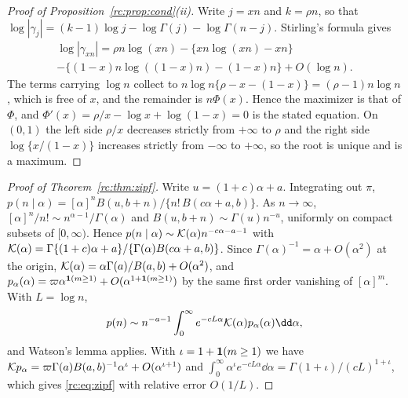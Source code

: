 \begin{proof}[Proof of Proposition~\ref{rc:prop:cond}(ii)]
Write $j=xn$ and $k=\rho n$, so that $\log|\gamma_j|=(k-1)\log j-\log\Gamma(j)-\log\Gamma(n-j)$. Stirling's formula gives
\begin{multline*}
\log|\gamma_{xn}|=\rho n\log(xn)-\{xn\log(xn)-xn\}\\
-\{(1-x)n\log((1-x)n)-(1-x)n\}+O(\log n).
\end{multline*}
The terms carrying $\log n$ collect to $n\log n\{\rho-x-(1-x)\}=(\rho-1)n\log n$, which is free of $x$, and the remainder is $n\Phi(x)$. Hence the maximizer is that of $\Phi$, and $\Phi'(x)=\rho/x-\log x+\log(1-x)=0$ is the stated equation. On $(0,1)$ the left side $\rho/x$ decreases strictly from $+\infty$ to $\rho$ and the right side $\log\{x/(1-x)\}$ increases strictly from $-\infty$ to $+\infty$, so the root is unique and is a maximum.
\end{proof}

\begin{proof}[Proof of Theorem~\ref{rc:thm:zipf}]
Write $u=(1+c)\alpha+a$. Integrating out $\pi$, $p(n\mid\alpha)=[\alpha]^nB(u,b+n)/\{n!\,B(c\alpha+a,b)\}$. As $n\to\infty$, $[\alpha]^n/n!\sim n^{\alpha-1}/\Gamma(\alpha)$ and $B(u,b+n)\sim\Gamma(u)n^{-u}$, uniformly on compact subsets of $[0,\infty)$. Hence $p(n\mid\alpha)\sim\mathcal{K}(\alpha)n^{-c\alpha-a-1}$ with $\mathcal{K}(\alpha)=\Gamma\{(1+c)\alpha+a\}/\{\Gamma(\alpha)B(c\alpha+a,b)\}$. Since $\Gamma(\alpha)^{-1}=\alpha+O(\alpha^2)$ at the origin, $\mathcal{K}(\alpha)=\alpha\Gamma(a)/B(a,b)+O(\alpha^2)$, and $p_\alpha(\alpha)=\varpi\alpha^{\mathbf{1}(m\ge1)}+O(\alpha^{1+\mathbf{1}(m\ge1)})$ by the same first order vanishing of $[\alpha]^m$. With $L=\log n$,
\[
p(n)\sim n^{-a-1}\int_0^\infty e^{-cL\alpha}\rcK(\alpha)p_\alpha(\alpha)\dd\alpha,
\]
and Watson's lemma applies. With $\iota=1+\mathbf{1}(m\ge1)$ we have $\mathcal{K} p_\alpha=\varpi\Gamma(a)B(a,b)^{-1}\alpha^\iota+O(\alpha^{\iota+1})$ and $\int_0^\infty\alpha^\iota e^{-cL\alpha}\dd\alpha=\Gamma(1+\iota)/(cL)^{1+\iota}$, which gives \eqref{rc:eq:zipf} with relative error $O(1/L)$.
\end{proof}

